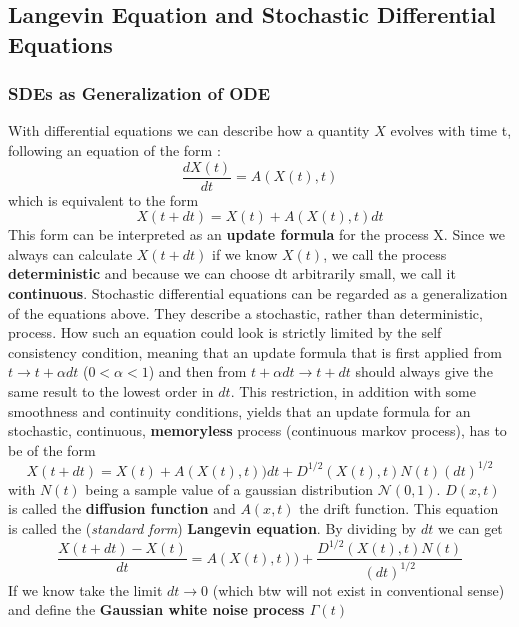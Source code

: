 	\subsection{Langevin Equation and Stochastic Differential Equations}
	\subsubsection{SDEs as Generalization of ODE}
	With differential equations we can describe how a quantity $X$ evolves with time t, following an equation of the form \cite{gillespie1996mathematics}:
	\begin{equation}
		\frac{dX(t)}{dt} =	A(X(t), t)
	\end{equation}
	which is equivalent to the form
	\begin{equation}
		X(t + dt) =	X(t) + A(X(t), t)dt
	\end{equation}
	This form can be interpreted as an \textbf{update formula} for the process X. Since we always can calculate $X(t + dt)$ if we know $X(t)$, we call the process \textbf{deterministic} and because we can choose dt arbitrarily small, we call it \textbf{continuous}. Stochastic differential equations can be regarded as a generalization of the equations above. They describe a stochastic, rather than deterministic, process. How such an equation could look is strictly limited by the self consistency condition, meaning that an update formula that is first applied from $t \rightarrow t + \alpha dt$ ($0 < \alpha < 1$) and then from $t + \alpha dt \rightarrow t + dt$ should always give the same result to the lowest order in $dt$. This restriction, in addition with some smoothness and continuity conditions, yields that an update formula for an stochastic, continuous, \textbf{memoryless} process (continuous markov process), has to be of the form
	\begin{equation}
		X(t + dt) =	X(t) + A(X(t), t))dt + D^{1/2}(X(t), t) N(t) (dt)^{1/2}
	\end{equation}
	with $N(t)$ being a sample value of a gaussian distribution $\mathcal{N}(0, 1)$. $D(x, t)$ is called the \textbf{diffusion function} and $A(x,t)$ the drift function. This equation is called the (\textit{standard form}) \textbf{Langevin equation}. By dividing by $dt$ we can get
	\begin{equation}
		\frac{X(t + dt) -	X(t)}{dt} =	A(X(t), t)) + \frac{D^{1/2}(X(t), t) N(t) }{(dt)^{1/2}}
	\end{equation}
	If we know take the limit $dt \rightarrow 0$ (which btw will not exist in conventional sense) and define the \textbf{Gaussian white noise process $\Gamma(t)$}
